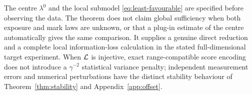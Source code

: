 The centre $\lambda^0$ and the local submodel \eqref{eq:least-favourable} are specified before observing the data. The theorem does not claim global sufficiency when both exposure and mark laws are unknown, or that a plug-in estimate of the centre automatically gives the same comparison. It supplies a genuine direct reduction and a complete local information-loss calculation in the stated full-dimensional target experiment. When $\mathcal L$ is injective, exact range-compatible score encoding does not introduce a $\gamma^{-2}$ statistical variance penalty; independent measurement errors and numerical perturbations have the distinct stability behaviour of Theorem~\ref{thm:stability} and Appendix~\ref{app:offset}.
